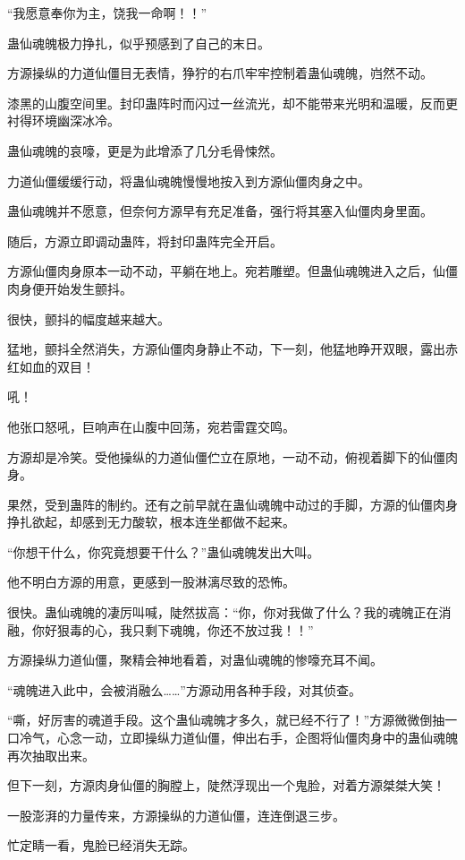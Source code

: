 \begin{this_body}
“我愿意奉你为主，饶我一命啊！！”

蛊仙魂魄极力挣扎，似乎预感到了自己的末日。

方源操纵的力道仙僵目无表情，狰狞的右爪牢牢控制着蛊仙魂魄，岿然不动。

漆黑的山腹空间里。封印蛊阵时而闪过一丝流光，却不能带来光明和温暖，反而更衬得环境幽深冰冷。

蛊仙魂魄的哀嚎，更是为此增添了几分毛骨悚然。

力道仙僵缓缓行动，将蛊仙魂魄慢慢地按入到方源仙僵肉身之中。

蛊仙魂魄并不愿意，但奈何方源早有充足准备，强行将其塞入仙僵肉身里面。

随后，方源立即调动蛊阵，将封印蛊阵完全开启。

方源仙僵肉身原本一动不动，平躺在地上。宛若雕塑。但蛊仙魂魄进入之后，仙僵肉身便开始发生颤抖。

很快，颤抖的幅度越来越大。

猛地，颤抖全然消失，方源仙僵肉身静止不动，下一刻，他猛地睁开双眼，露出赤红如血的双目！

吼！

他张口怒吼，巨响声在山腹中回荡，宛若雷霆交鸣。

方源却是冷笑。受他操纵的力道仙僵伫立在原地，一动不动，俯视着脚下的仙僵肉身。

果然，受到蛊阵的制约。还有之前早就在蛊仙魂魄中动过的手脚，方源的仙僵肉身挣扎欲起，却感到无力酸软，根本连坐都做不起来。

“你想干什么，你究竟想要干什么？”蛊仙魂魄发出大叫。

他不明白方源的用意，更感到一股淋漓尽致的恐怖。

很快。蛊仙魂魄的凄厉叫喊，陡然拔高：“你，你对我做了什么？我的魂魄正在消融，你好狠毒的心，我只剩下魂魄，你还不放过我！！”

方源操纵力道仙僵，聚精会神地看着，对蛊仙魂魄的惨嚎充耳不闻。

“魂魄进入此中，会被消融么……”方源动用各种手段，对其侦查。

“嘶，好厉害的魂道手段。这个蛊仙魂魄才多久，就已经不行了！”方源微微倒抽一口冷气，心念一动，立即操纵力道仙僵，伸出右手，企图将仙僵肉身中的蛊仙魂魄再次抽取出来。

但下一刻，方源肉身仙僵的胸膛上，陡然浮现出一个鬼脸，对着方源桀桀大笑！

一股澎湃的力量传来，方源操纵的力道仙僵，连连倒退三步。

忙定睛一看，鬼脸已经消失无踪。


\end{this_body}
